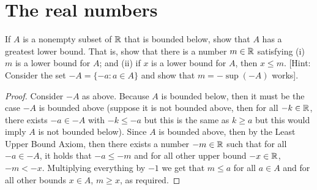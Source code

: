 \section{The real numbers}

\begin{exercise}{1}
If $A$ is a nonempty subset of $\mathbb{R}$ that is bounded below, show that $A$ has a greatest lower bound. That is, show that there is a number $m\in\mathbb{R}$ satisfying (i) $m$ is a lower bound for $A$; and (ii) if $x$ is a lower bound for $A$, then $x\leq m$. [Hint: Consider the set $-A=\{-a:a\in A\}$ and show that $m=-\sup(-A)$ works].
\end{exercise}
\begin{proof}
Consider $-A$ as above. Because $A$ is bounded below, then it must be the case $-A$ is bounded above (suppose it is not bounded above, then for all $-k\in\mathbb{R}$, there exists $-a\in -A$ with $-k\leq -a$ but this is the same as $k\geq a$ but this would imply $A$ is not bounded below). Since $A$ is bounded above, then by the Least Upper Bound Axiom, then there exists a number $-m\in\mathbb{R}$ such that for all $-a\in -A$, it holds that $-a\leq -m$ and for all other upper bound $-x\in\mathbb{R}$, $-m<-x$. Multiplying everything by $-1$ we get that $m\leq a$ for all $a\in A$ and for all other bounds $x\in A$, $m\geq x$, as required.
\end{proof}

